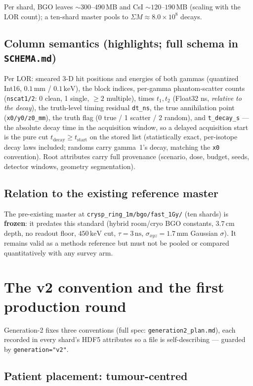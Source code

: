 \documentclass[11pt,a4paper]{article}
\newcommand{\ns}{\,\mathrm{ns}}
\newcommand{\keV}{\,\mathrm{keV}}
\begin{document}
Per shard, BGO leaves ${\sim}300$--$490$\,MB and CsI ${\sim}120$--$190$\,MB (scaling with the
LOR count); a ten-shard master pools to $\Sigma M \approx 8.0\times10^8$ decays.

\subsection*{Column semantics (highlights; full schema in \texttt{SCHEMA.md})}

Per LOR: smeared 3-D hit positions and energies of both gammas (quantized Int16, $0.1$\,mm /
$0.1\keV$), the block indices, per-gamma phantom-scatter counts (\texttt{nscat1/2}: 0 clean,
1 single, $\ge 2$ multiple), times $t_1, t_2$ (Float32 ns, \emph{relative to the decay}), the
truth-level timing residual \texttt{dt\_ns}, the true annihilation point
(\texttt{x0/y0/z0\_mm}), the truth flag (0 true / 1 scatter / 2 random), and
\texttt{t\_decay\_s} --- the absolute decay time in the acquisition window, so a delayed
acquisition start is the pure cut $t_{\mathrm{decay}} \ge t_{\mathrm{start}}$ on the stored
list (statistically exact, per-isotope decay laws included; randoms carry gamma~1's decay,
matching the \texttt{x0} convention). Root attributes carry full provenance (scenario, dose,
budget, seeds, detector windows, geometry segmentation).

\subsection*{Relation to the existing reference master}

The pre-existing master at \texttt{crysp\_ring\_1m/bgo/fast\_1Gy/} (ten shards) is
\textbf{frozen}: it predates this standard (hybrid room/cryo BGO constants, $3.7$\,cm depth,
no readout floor, $450\keV$ cut, $\tau = 3\ns$, $\sigma_{xyz} = 1.7$\,mm Gaussian $\sigma$).
It remains valid as a methods reference but must not be pooled or compared quantitatively with
any survey arm.

\section{The v2 convention and the first production round}
\label{sec:activity}

Generation-2 fixes three conventions (full spec: \texttt{generation2\_plan.md}), each recorded in
every shard's HDF5 attributes so a file is self-describing --- guarded by \texttt{generation="v2"}.

\subsection*{Patient placement: tumour-centred}
\end{document}
